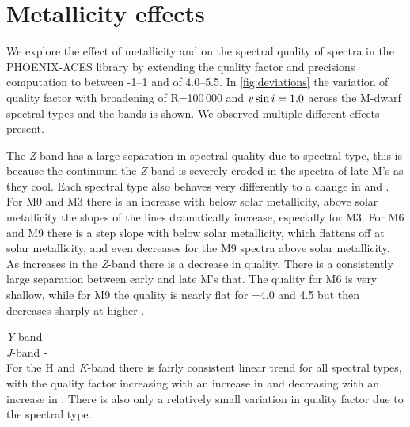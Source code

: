 
%

\section{Metallicity \logg{} effects}
We explore the effect of metallicity and \logg{} on the spectral quality of spectra in the {PHOENIX-ACES} library by extending the quality factor and precisions computation to \feh{} between -1--1 and \logg{} of 4.0--5.5.
In \cref{fig:deviations} the variation of quality factor with broadening of R=100\,000 and $v\sin{i}=1.0$\kmps{} across the {M-dwarf} spectral types and the \nir{} bands is shown.
We observed multiple different effects present.


The \emph{Z}-band has a large separation in spectral quality due to spectral type, this is because the continuum the \emph{Z}-band is severely eroded in the spectra of late M's as they cool.
Each spectral type also behaves very differently to a change in \feh{} and \logg{}.
For {M0} and {M3} there is an increase with \feh{} below solar metallicity, above solar metallicity the slopes of the lines dramatically increase, especially for {M3}.
For {M6} and {M9} there is a step slope with \feh{} below solar metallicity, which flattens off at solar metallicity, and even decreases for the {M9} spectra above solar metallicity.
As \logg{} increases in the \emph{Z}-band there is a decrease in quality.
There is a consistently large separation between early and late M's that.
The quality for {M6} is very shallow, while for {M9} the quality is nearly flat for \logg{}=4.0 and 4.5 but then decreases sharply at higher \logg{}.

\emph{Y}-band -\\

\emph{J}-band - \\

For the H and \emph{K}-band there is fairly consistent linear trend for all spectral types, with the quality factor increasing with an increase in \feh{} and decreasing with an increase in \logg{}.
There is also only a relatively small variation in quality factor due to the spectral type.



